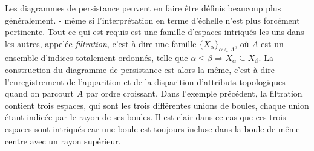 
Les diagrammes de persistance peuvent en faire \^etre d\'efinis beaucoup plus g\'en\'eralement.
 - m\^eme si l'interpr\'etation en terme d'\'echelle n'est plus forc\'ement pertinente.
Tout ce qui est requis est une famille d'espaces intriqu\'es les uns dans les autres, appel\'ee {\em filtration}, 
c'est-\`a-dire une famille $\{X_\alpha\}_{\alpha\in A}$,
o\`u $A$ est un ensemble d'indices totalement ordonn\'es, telle que $\alpha\leq\beta\Rightarrow X_\alpha\subseteq X_\beta$.
La construction du diagramme de persistance est alors la m\^eme, c'est-\`a-dire l'enregistrement de l'apparition et de la disparition
d'attributs topologiques quand on parcourt $A$ par ordre croissant. Dans l'exemple pr\'ec\'edent, la filtration contient trois espaces, qui sont 
les trois diff\'erentes unions de boules, chaque union \'etant indic\'ee par le rayon de ses boules.
Il est clair dans ce cas que ces trois espaces sont intriqu\'es car une boule est toujours incluse dans la boule de m\^eme centre avec un rayon sup\'erieur.


